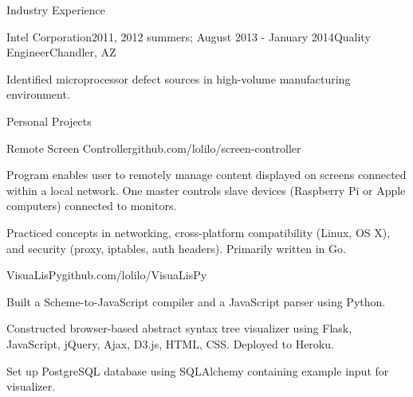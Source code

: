 \documentclass{resume} %
\begin{document}
\begin{rSection}{Industry Experience}

\begin{rSubsection}{Intel Corporation}{2011, 2012 summers; August 2013 - January 2014}{Quality Engineer}{Chandler, AZ}
\item Identified microprocessor defect sources in high-volume manufacturing environment.
\end{rSubsection}

\end{rSection}


\begin{rSection}{Personal Projects}


\begin{rSubsection}{Remote Screen Controller}{github.com/lolilo/screen-controller}{}{}
\item Program enables user to remotely manage content displayed on screens connected within a local network. One master controls slave devices (Raspberry Pi or Apple computers) connected to monitors.
\item Practiced concepts in networking, cross-platform compatibility (Linux, OS X), and security (proxy, iptables, auth headers). Primarily written in Go.
\end{rSubsection}


\begin{rSubsection}{VisuaLisPy}{github.com/lolilo/VisuaLisPy}{}{}
\item Built a Scheme-to-JavaScript compiler and a JavaScript parser using Python.
\item Constructed browser-based abstract syntax tree visualizer using Flask, JavaScript, jQuery, Ajax, D3.js, HTML, CSS. Deployed to Heroku.
\item Set up PostgreSQL database using SQLAlchemy containing example input for visualizer.
\end{rSubsection}

\end{rSection}
\end{document}
